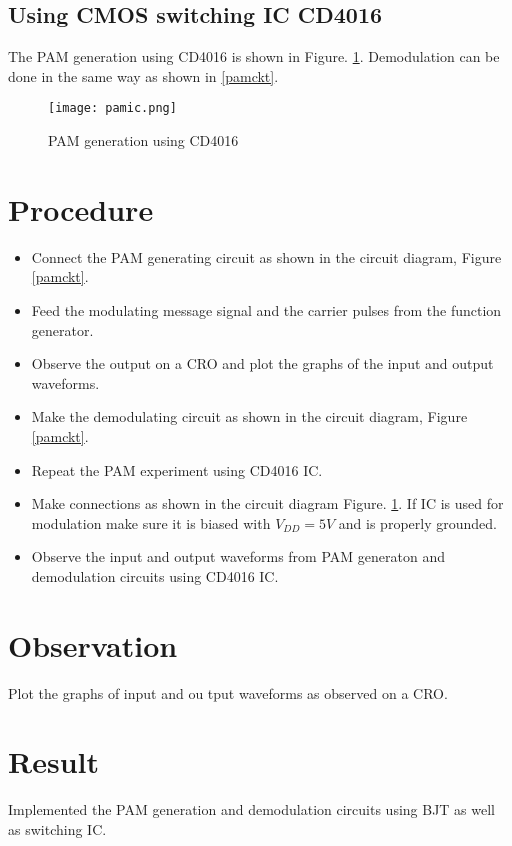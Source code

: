 \subsection*{Using CMOS switching IC CD4016}
The PAM generation using CD4016 is shown in Figure. \ref{pamckt2}. Demodulation can be done in the same way as shown in \ref{pamckt}.

\begin{figure}
\texttt{[image: pamic.png]}
\caption{PAM generation using CD4016}
\label{pamckt2}
\end{figure}

\section*{Procedure}
\begin{itemize}
\item
Connect the PAM generating circuit as shown in the circuit diagram, Figure \ref{pamckt}.
\item
Feed the modulating message signal and the carrier pulses from the function generator.
\item
Observe the output on a CRO and plot the graphs of the input and output waveforms.
\item
Make the demodulating circuit as shown in the circuit diagram, Figure \ref{pamckt}.
\item
Repeat the PAM experiment using CD4016 IC.
\item
Make connections as shown in the circuit diagram Figure. \ref{pamckt2}. If IC is used for modulation make sure it is biased with $V_{DD}=5V$ and is properly grounded.
\item
Observe the input and output waveforms from PAM generaton and demodulation circuits using CD4016 IC.

\end{itemize}
\section*{Observation}
Plot the graphs of input and ou
tput waveforms as observed on a CRO.
\section*{Result}

Implemented the PAM generation and demodulation circuits using BJT as well as switching IC.
